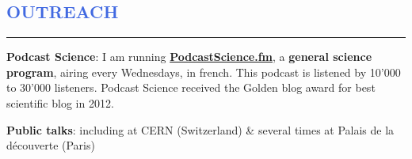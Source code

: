 \documentclass[11pt]{article}
\begin{document}

\vspace{-0.75cm}
\textcolor{RoyalBlue}{\section{\large OUTREACH}
\vspace{-0.45cm}\hrule}
\vspace{0.45cm}
\textbf{Podcast Science}: I am running \href{http://www.podcastscience.fm}
{\textbf{PodcastScience.fm}}, a \textbf{general science program}, airing every
Wednesdays, in french. This podcast is listened by 10'000 to 30'000
listeners. Podcast Science received the Golden blog award for
best scientific blog in 2012.

\vspace{0.3cm}

\textbf{Public talks}: including at CERN (Switzerland) \& several times at Palais de la découverte (Paris)\\






\end{document}
